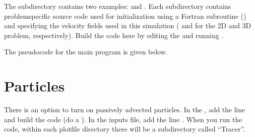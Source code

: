 \documentclass[letterpaper,10pt,english]{sphinxmanual}
\begin{document}
\sphinxAtStartPar
The  subdirectory contains two examples:  and
. Each subdirectory contains problem\sphinxhyphen{}specific source code
used for initialization using a Fortran subroutine () and
specifying the velocity fields used in this simulation
( and  for the 2\sphinxhyphen{}D and 3\sphinxhyphen{}D
problem, respectively). Build the code here by editing the 
and running .

\sphinxAtStartPar
The pseudocode for the main program is given below.

\begin{sphinxVerbatim}[commandchars=\\\{\}]
   
   
        \PYG{p}{[}\PYG{p}{]}
        \PYG{p}{[}\PYG{p}{]} 
\end{sphinxVerbatim}


\section{Particles}
\label{\detokenize{AmrLevel:particles}}
\sphinxAtStartPar
There is an option to turn on passively advected particles. In the
, add the line  and build the code
(do a ).
In the inputs file, add the line .
When you run the code, within each plotfile directory there will be a
subdirectory called “Tracer”.
\end{document}
